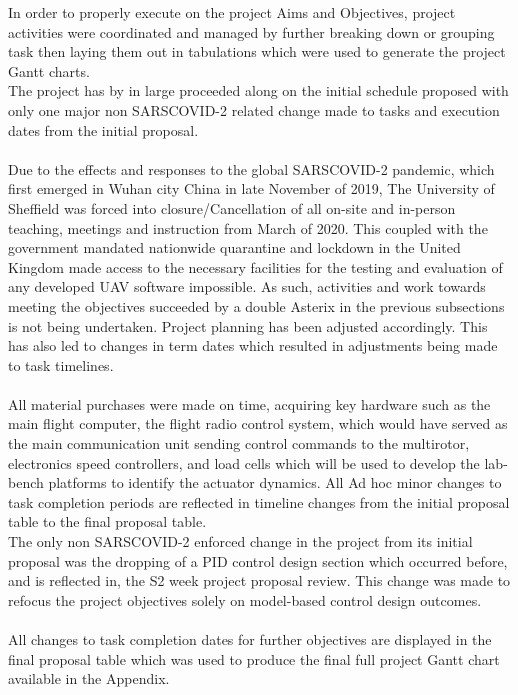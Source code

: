\documentclass[12pt,a4paper,twoside]{report}
\begin{document}
			In order to properly execute on the project Aims and Objectives, project activities were coordinated and managed by further breaking down or grouping task then laying them out in tabulations which were used to generate the project Gantt charts.
			\\
			The project has by in large proceeded along on the initial schedule proposed with only one major non SARSCOVID-2 related change made to tasks and execution dates from the initial proposal. 
			\\ \\
			Due to the effects and responses to the global SARSCOVID-2 pandemic, which first emerged in Wuhan city China in late November of 2019, The University of Sheffield was forced into closure/Cancellation of all on-site and in-person teaching, meetings and instruction from March of 2020. This coupled with the government mandated nationwide quarantine and lockdown in the United Kingdom made access to the necessary facilities for the testing and evaluation of any developed UAV software impossible. As such, activities and work towards meeting the objectives succeeded by a double Asterix in the previous subsections is not being undertaken. Project planning has been adjusted accordingly. This has also led to changes in term dates which resulted in adjustments being made to task timelines.
			\\ \\
			All material purchases were made on time, acquiring key hardware such as the main flight computer, the flight radio control system, which would have served as the main communication unit sending control commands to the multirotor, electronics speed controllers, and load cells which will be used to develop the lab-bench platforms to identify the actuator dynamics. All Ad hoc minor changes to task completion periods are reflected in timeline changes from the initial proposal table to the final proposal table. 
			\\
			The only non SARSCOVID-2 enforced change in the project from its initial proposal was the dropping of a PID control design section which occurred before, and is reflected in, the S2 week project proposal review. This change was made to refocus the project objectives solely on model-based control design outcomes.
			\\ \\
			All changes to task completion dates for further objectives are displayed in the final proposal table which was used to produce the final full project Gantt chart available in the Appendix.
			
\end{document}
